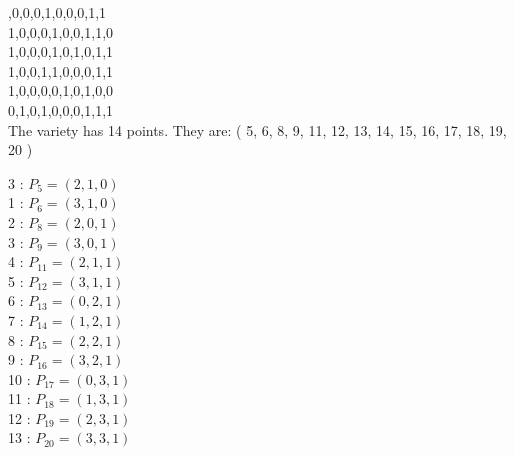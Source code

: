 \documentclass{article}
\begin{document}
{,0,0,0,1,0,0,0,1,1\\
1,0,0,0,1,0,0,1,1,0\\
1,0,0,0,1,0,1,0,1,1\\
1,0,0,1,1,0,0,0,1,1\\
1,0,0,0,0,1,0,1,0,0\\
0,1,0,1,0,0,0,1,1,1\\
The variety has 14 points. They are: 
( 5, 6, 8, 9, 11, 12, 13, 14, 15, 16, 17, 18, 19, 20 )\\
\begin{multicols}{3}
 : $P_{5}=( 2, 1, 0 )$\\
1 : $P_{6}=( 3, 1, 0 )$\\
2 : $P_{8}=( 2, 0, 1 )$\\
3 : $P_{9}=( 3, 0, 1 )$\\
4 : $P_{11}=( 2, 1, 1 )$\\
5 : $P_{12}=( 3, 1, 1 )$\\
6 : $P_{13}=( 0, 2, 1 )$\\
7 : $P_{14}=( 1, 2, 1 )$\\
8 : $P_{15}=( 2, 2, 1 )$\\
9 : $P_{16}=( 3, 2, 1 )$\\
10 : $P_{17}=( 0, 3, 1 )$\\
11 : $P_{18}=( 1, 3, 1 )$\\
12 : $P_{19}=( 2, 3, 1 )$\\
13 : $P_{20}=( 3, 3, 1 )$\\
\end{multicols}


%


%


}%
\end{document}
